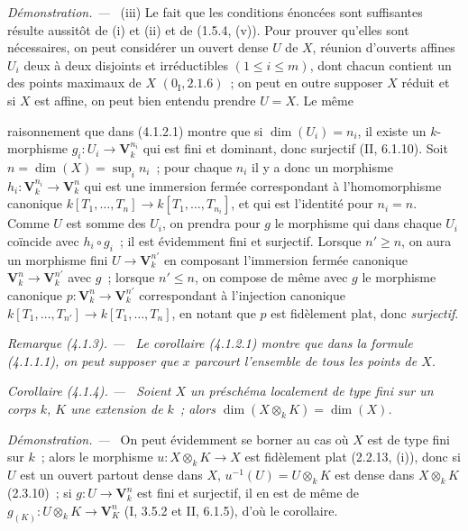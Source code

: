 \documentclass[10pt,oneside]{book}
\newcommand{\oldpage}[2][]{%
  \setcounter{footnote}{0}%
  \marginpar{\scriptsize\textbf{#1}~|~#2}\ignorespaces}
\newenvironment{corollary}[1][]{%
  \par\medskip\noindent\itshape Corollaire (#1). ---\ }{\par}
\newenvironment{remark}[1][]{%
  \par\medskip\noindent\itshape Remarque (#1). ---\ }{\par}
\newenvironment{proof}{%
  \par\medskip\noindent\textit{Démonstration. ---\ }}{\par}
\begin{document}
\begin{proof}
(iii) Le fait que les conditions énoncées sont suffisantes résulte aussitôt de
(i) et (ii) et de (1.5.4, (v)). Pour prouver qu'elles sont nécessaires, on peut
considérer un ouvert dense $U$ de $X$, réunion d'ouverts affines $U_i$ deux à
deux disjoints et irréductibles $(1\leqslant i\leqslant m)$, dont chacun
contient un des points maximaux de $X$ $(0_{\mathrm I},2.1.6)$~; on peut en
outre supposer $X$ réduit et si $X$ est affine, on peut bien entendu prendre
$U=X$. Le même

\oldpage[IV-2]{54}

raisonnement que dans (4.1.2.1) montre que si $\dim(U_i)=n_i$, il existe un
$k$-morphisme $g_i:U_i\to\mathbf V_k^{n_i}$ qui est fini et dominant, donc
surjectif (II, 6.1.10). Soit $n=\dim(X)=\sup_i n_i$~; pour chaque $n_i$ il y a
donc un morphisme $h_i:\mathbf V_k^{n_i}\to\mathbf V_k^n$ qui est une
immersion fermée correspondant à l'homomorphisme canonique
$k[T_1,\ldots,T_n]\to k[T_1,\ldots,T_{n_i}]$, et qui est l'identité pour
$n_i=n$. Comme $U$ est somme des $U_i$, on prendra pour $g$ le morphisme qui
dans chaque $U_i$ coïncide avec $h_i\circ g_i$~; il est évidemment fini et
surjectif. Lorsque $n'\geqslant n$, on aura un morphisme fini
$U\to\mathbf V_k^{n'}$ en composant l'immersion fermée canonique
$\mathbf V_k^n\to\mathbf V_k^{n'}$ avec $g$~; lorsque $n'\leqslant n$, on
compose de même avec $g$ le morphisme canonique
$p:\mathbf V_k^n\to\mathbf V_k^{n'}$ correspondant à l'injection canonique
$k[T_1,\ldots,T_{n'}]\to k[T_1,\ldots,T_n]$, en notant que $p$ est fidèlement
plat, donc \emph{surjectif}.
\end{proof}

\begin{remark}[4.1.3]
\label{IV.2.4.1.3-fr}
Le corollaire (4.1.2.1) montre que dans la formule (4.1.1.1), on peut supposer
que $x$ parcourt l'ensemble de \emph{tous les points} de $X$.
\end{remark}

\begin{corollary}[4.1.4]
\label{IV.2.4.1.4-fr}
Soient $X$ un préschéma localement de type fini sur un corps $k$, $K$ une
extension de $k$~; alors $\dim(X\otimes_k K)=\dim(X)$.
\end{corollary}

\begin{proof}
On peut évidemment se borner au cas où $X$ est de type fini sur $k$~; alors le
morphisme $u:X\otimes_k K\to X$ est fidèlement plat (2.2.13, (i)), donc si
$U$ est un ouvert partout dense dans $X$, $u^{-1}(U)=U\otimes_k K$ est dense
dans $X\otimes_k K$ (2.3.10)~; si $g:U\to\mathbf V_k^n$ est fini et
surjectif, il en est de même de
$g_{(K)}:U\otimes_k K\to\mathbf V_K^n$ (I, 3.5.2 et II, 6.1.5), d'où le
corollaire.
\end{proof}
\end{document}

